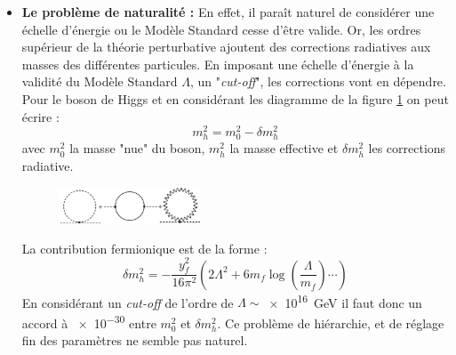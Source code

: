 \begin{itemize}[label=$\bullet$]
\item \textbf{Le problème de naturalité :} En effet, il paraît naturel de considérer une échelle d'énergie ou le Modèle Standard cesse d'être valide. Or, les ordres supérieur de la théorie perturbative ajoutent des corrections radiatives aux masses des différentes particules. En imposant une échelle d'énergie à la validité du Modèle Standard $\Lambda$, un "\textit{cut-off}", les corrections vont en dépendre. Pour le boson de Higgs et en considérant les diagramme de la figure \cref{corrections} on peut écrire :
\begin{equation}
m_{h}^{2}=m_{0}^{2}-\delta m_{h}^{2}
\end{equation}
avec $m_{0}^{2}$ la masse "nue" du boson, $m_{h}^{2}$ la masse effective et $\delta m_{h}^{2}$ les corrections radiative.
\begin{figure}[ht!]
\centering
\includegraphics[width=0.40\textwidth]{SM/corrections.jpg}
\label{corrections}
\end{figure}
La contribution fermionique est de la forme :
\begin{equation}
\label{eq1}
\delta m_{h}^{2}=-\frac{y_{f}^{2}}{16\pi^{2}}\left(2\Lambda^{2}+6m_{f}\log\left(\frac{\Lambda}{m_{f}}\right)\cdots\right)
\end{equation}
En considérant un \textit{cut-off} de l'ordre de $\Lambda \sim$\SI{e16}{\giga\eV} il faut donc un accord à \num{e-30} entre $m_{0}^{2}$ et $\delta m_{h}^{2}$. Ce problème de hiérarchie, et de réglage fin des paramètres ne semble pas naturel.


\end{itemize}
